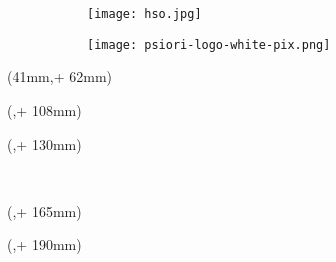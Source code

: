 \captionsetup[figure]{labelformat=empty}
\noindent 
\begin{figure}
	\begin{subfigure}[b]{0.5\textwidth}
	\texttt{[image: hso.jpg]}
	\end{subfigure} 
	\begin{subfigure}[b]{0.5\textwidth}
		\centering
		\texttt{[image: psiori-logo-white-pix.png]}
	\end{subfigure} 
	\caption[]{}
\end{figure}
\captionsetup[figure]{labelformat=simple}
\begin{textblock*}{128mm}(41mm,\seitenanfang + 62mm) %
  \centering\Large\sffamily
  \vspace{12mm} %
  \textbf{\hsmatitel}
\end{textblock*}%

\begin{textblock*}{\seitenbreite}(\bindekorrektur,\seitenanfang + 108mm)
  \centering\large\sffamily
  \hsmaautor
\end{textblock*}

\begin{textblock*}{\seitenbreite}(\bindekorrektur,\seitenanfang + 130mm)
  \centering\large\sffamily
  \textbf{\hsmatyp}\\
  \begin{small}\hsmathesistype \end{small}\\
  \vspace{6mm}
  \hsmastudiengangname
\end{textblock*}

\begin{textblock*}{\seitenbreite}(\bindekorrektur,\seitenanfang + 165mm)
  \centering\large\sffamily
  \hsmafakultaetlang\\
  \vspace{2mm}
  \hsmakoerperschaft
\end{textblock*}

\begin{textblock*}{\seitenbreite}(\bindekorrektur,\seitenanfang + 190mm)
  \centering\large 
  \textsf{\hsmadatum}
\end{textblock*}

